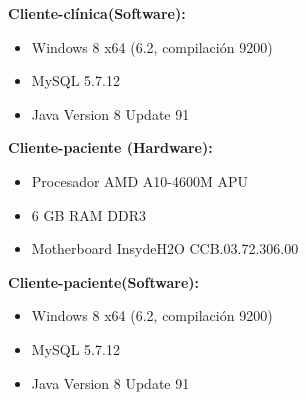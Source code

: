 \bfseries Cliente-cl\'inica(Software): \mdseries
\begin{itemize}
\item Windows 8 x64 (6.2, compilaci\'on 9200)
\item MySQL 5.7.12
\item Java Version 8 Update 91
\end{itemize}
\bfseries Cliente-paciente (Hardware): \mdseries
\begin{itemize}
\item Procesador AMD A10-4600M APU
\item 6 GB RAM DDR3
\item Motherboard InsydeH2O CCB.03.72.306.00
\end{itemize}

\bfseries Cliente-paciente(Software): \mdseries
\begin{itemize}
\item Windows 8 x64 (6.2, compilaci\'on 9200)
\item MySQL 5.7.12
\item Java Version 8 Update 91
\end{itemize}

